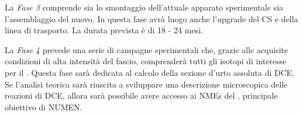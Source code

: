 La \emph{Fase 3} comprende sia lo smontaggio dell'attuale apparato sperimentale sia l'assemblaggio del nuovo. In questa fase avrà luogo anche l'upgrade del CS e della linea di trasporto. La durata prevista è di 18 - 24 mesi.


La \emph{Fase 4} prevede una serie di campagne sperimentali che, grazie alle acquisite condizioni di alta intensità del fascio, comprenderà tutti gli isotopi di interesse per il \doppiobeta{}. 
Questa fase sarà dedicata al calcolo della sezione d'urto assoluta di DCE. Se l'analisi teorica sarà riuscita a sviluppare una descrizione microscopica delle reazioni di DCE, allora sarà possibile avere accesso ai NMEs del \doppiobeta{}, principale obiettivo di NUMEN.










\clearpage
